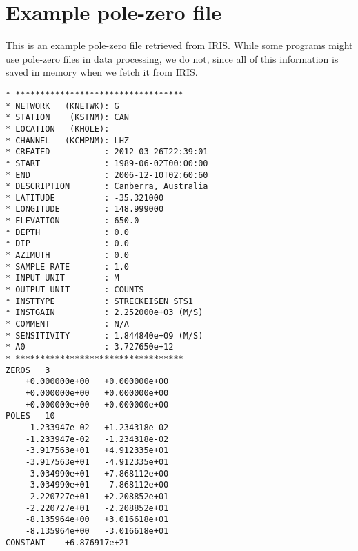 \documentclass[11pt,titlepage,fleqn]{article}
\begin{document}


\pagebreak

\appendix

\section{Example pole-zero file}
\label{sec:pz}

This is an example pole-zero file retrieved from IRIS. While some programs might use pole-zero files in data processing, we do not, since all of this information is saved in memory when we fetch it from IRIS.

\small
\begin{spacing}{1.0}
\begin{verbatim}
* **********************************
* NETWORK   (KNETWK): G
* STATION    (KSTNM): CAN
* LOCATION   (KHOLE): 
* CHANNEL   (KCMPNM): LHZ
* CREATED           : 2012-03-26T22:39:01
* START             : 1989-06-02T00:00:00
* END               : 2006-12-10T02:60:60
* DESCRIPTION       : Canberra, Australia
* LATITUDE          : -35.321000
* LONGITUDE         : 148.999000 
* ELEVATION         : 650.0  
* DEPTH             : 0.0  
* DIP               : 0.0  
* AZIMUTH           : 0.0  
* SAMPLE RATE       : 1.0
* INPUT UNIT        : M
* OUTPUT UNIT       : COUNTS
* INSTTYPE          : STRECKEISEN STS1
* INSTGAIN          : 2.252000e+03 (M/S)
* COMMENT           : N/A
* SENSITIVITY       : 1.844840e+09 (M/S)
* A0                : 3.727650e+12
* **********************************
ZEROS	3
	+0.000000e+00	+0.000000e+00
	+0.000000e+00	+0.000000e+00
	+0.000000e+00	+0.000000e+00
POLES	10
	-1.233947e-02	+1.234318e-02
	-1.233947e-02	-1.234318e-02
	-3.917563e+01	+4.912335e+01
	-3.917563e+01	-4.912335e+01
	-3.034990e+01	+7.868112e+00
	-3.034990e+01	-7.868112e+00
	-2.220727e+01	+2.208852e+01
	-2.220727e+01	-2.208852e+01
	-8.135964e+00	+3.016618e+01
	-8.135964e+00	-3.016618e+01
CONSTANT	+6.876917e+21
\end{verbatim}
\end{spacing}
\normalsize



%

\end{document}
